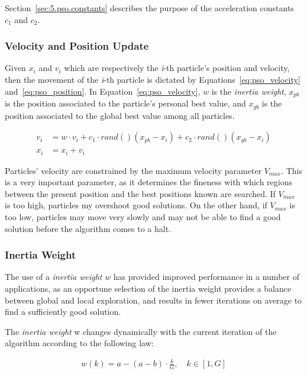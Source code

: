 Section~\ref{sec:5.pso.constants} describes the purpose of the acceleration
constants $c_1$ and $c_2$.

\subsubsection{Velocity and Position Update}
\label{sec:5.pso.speed}

Given $x_i$ and $v_i$ which are respectively the \textit{i}-th particle's position
and velocity, then the movement of the \textit{i}-th particle is dictated by
Equations~\ref{eq:pso_velocity} and~\ref{eq:pso_position}.
In Equation~\ref{eq:pso_velocity}, $w$ is the \textit{inertia weight},
$x_{pb}$ is the position associated to the particle's personal best value, 
and $x_{gb}$ is the position associated to the global best value among all particles.

\begin{align}
v_i &= w\cdot v_i + c_1 \cdot rand() \left(x_{pb}-x_i\right)+c_2\cdot rand() \left(x_{gb}-x_i\right) \label{eq:pso_velocity} \\
x_i &= x_i + v_i \label{eq:pso_position}
\end{align}

Particles' velocity are constrained by the maximum velocity parameter $V_{max}$.
This is a very important parameter, as it determines the fineness with which regions
between the present position and the best positions known are searched.
If $V_{max}$ is too high, particles my overshoot good solutions. On the other hand,
if $V_{max}$ is too low, particles may move very slowly and may not be able to find
a good solution before the algorithm comes to a halt.

\subsubsection{Inertia Weight}
\label{sec:5.inertia}

The use of a \textit{inertia weight} $w$ has provided improved performance
in a number of applications, as an opportune selection of the inertia weight 
provides a balance between global and local exploration,
and results in fewer iterations on average to find a sufficiently good solution.

The \textit{inertia weight} w changes dynamically with the current iteration
of the algorithm according to the following law:

\begin{align*}
	w(k) = a-(a-b)\cdot \frac{k}{G},\quad k \in \left[1,G\right]
\end{align*}

